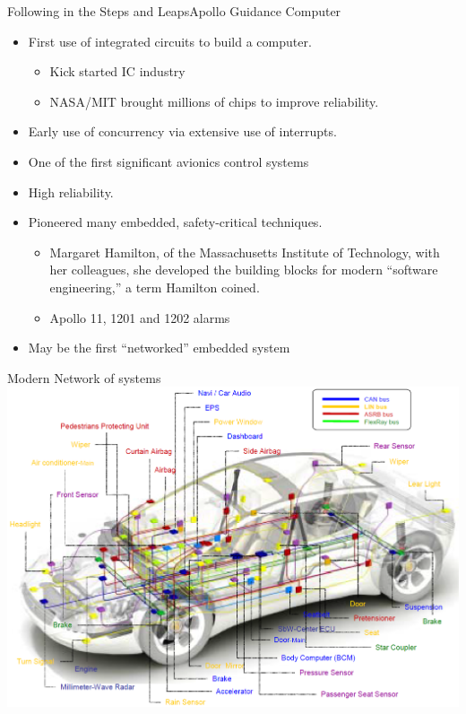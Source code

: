 \documentclass[xcolor=svgnames]{beamer}
\begin{document}
\begin{frame}{Following in the Steps and Leaps}{Apollo Guidance Computer}
\begin{itemize}[<+->]
  \item First use of integrated circuits to build a computer.
  \begin{itemize}
    \item Kick started IC industry
    \item NASA/MIT brought millions of chips to improve reliability.
  \end{itemize}
  \item Early use of concurrency via extensive use of interrupts.
  \item One of the first significant avionics control systems
  \item High reliability.
  \item Pioneered many embedded, safety-critical techniques.
  \begin{itemize}
    \item Margaret Hamilton, of the Massachusetts Institute of Technology,
      with her colleagues, she developed the building blocks for modern
      ``software engineering,''
      a term Hamilton coined.
    \item Apollo 11, 1201 and 1202 alarms
  \end{itemize}
  \item May be the first ``networked'' embedded system

\end{itemize}
\end{frame}

\begin{frame}{Modern Network of systems}
    \includegraphics[width=\textwidth]{CAN-car.png}
\end{frame}
\end{document}
